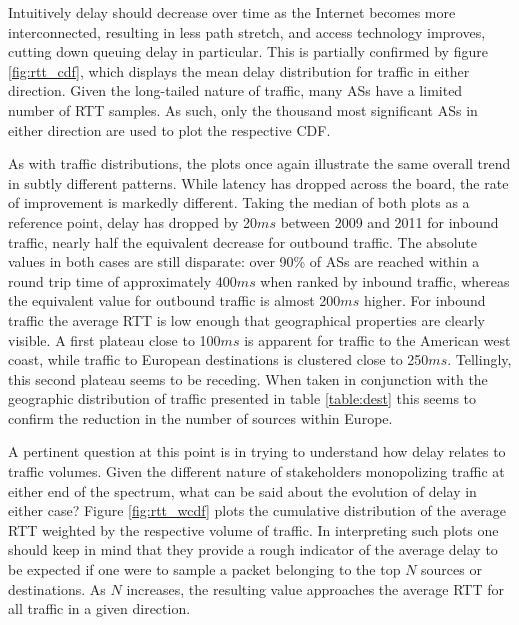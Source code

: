 Intuitively delay should decrease over time as the Internet becomes more interconnected, resulting in less path stretch, and access technology improves, cutting down queuing delay in particular.
This is partially confirmed by figure \ref{fig:rtt_cdf}, which displays the mean delay distribution for traffic in either direction.
Given the long-tailed nature of traffic, many \acp{AS} have a limited number of \ac{RTT} samples.
As such, only the thousand most significant \acp{AS} in either direction are used to plot the respective \acs{CDF}.

As with traffic distributions, the plots once again illustrate the same overall trend in subtly different patterns. 
While latency has dropped across the board, the rate of improvement is markedly different. 
Taking the median of both plots as a reference point, delay has dropped by 20$ms$ between 2009 and 2011 for inbound traffic, nearly half the equivalent decrease for outbound traffic.
The absolute values in both cases are still disparate: over 90\% of \acp{AS} are reached within a round trip time of approximately 400$ms$ when ranked by inbound traffic, whereas the equivalent value for outbound traffic is almost 200$ms$ higher. 
For inbound traffic the average \ac{RTT} is low enough that geographical properties are clearly visible. 
A first plateau close to 100$ms$ is apparent for traffic to the American west coast, while traffic to European destinations is clustered close to 250$ms$. 
Tellingly, this second plateau seems to be receding.
When taken in conjunction with the geographic distribution of traffic presented in table \ref{table:dest} this seems to confirm the reduction in the number of sources within Europe. 

A pertinent question at this point is in trying to understand how delay relates to traffic volumes. 
Given the different nature of stakeholders monopolizing traffic at either end of the spectrum, what can be said about the evolution of delay in either case? 
Figure \ref{fig:rtt_wcdf} plots the cumulative distribution of the average \ac{RTT} weighted by the respective volume of traffic.
In interpreting such plots one should keep in mind that they provide a rough indicator of the average delay to be expected if one were to sample a packet belonging to the top $N$ sources or destinations. 
As $N$ increases, the resulting value approaches the average RTT for all traffic in a given direction.

